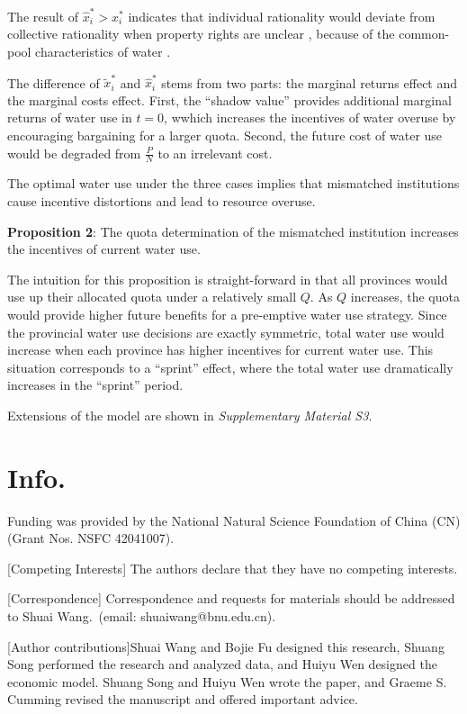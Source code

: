 \documentclass{article}
\begin{document}
The result of $\hat x_i^*>x_i^*$ indicates that individual rationality would deviate from collective rationality when property rights are unclear \cite{hardinTragedyCommons2009}, because of the common-pool characteristics of water
\cite{castilla-rhoGroundwaterCommonPool2020,ostromGeneralFrameworkAnalyzing2009}.

The difference of $\widetilde x_i^*$ and $\hat x_i^*$ stems from two parts: the marginal returns effect and the marginal costs effect. First, the “shadow value” provides additional marginal returns of water use in $t=0$, wwhich increases the incentives of water overuse by encouraging bargaining for a larger quota. Second, the future cost of water use would be degraded from $\frac{P}{N}$ to an irrelevant cost.

The optimal water use under the three cases implies that mismatched institutions cause incentive distortions and lead to resource overuse.

\textbf{Proposition 2}: The quota determination of the mismatched institution increases the incentives of current water use.

The intuition for this proposition is straight-forward in that all provinces would use up their allocated quota under a relatively small $Q$. As $Q$ increases, the quota would provide higher future benefits for a pre-emptive water use strategy. Since the provincial water use decisions are exactly symmetric, total water use would increase when each province has higher incentives for current water use. This situation corresponds to a “sprint” effect, where the total water use dramatically increases in the “sprint” period.

Extensions of the model are shown in \textit{Supplementary Material S3}.


\section{Info.}
Funding was provided by the National Natural Science Foundation of China (CN) (Grant Nos. NSFC 42041007).

[Competing Interests] The authors declare that they have no competing interests.

[Correspondence] Correspondence and requests for materials should be addressed to Shuai Wang.~(email: shuaiwang@bnu.edu.cn).

[Author contributions]Shuai Wang and Bojie Fu designed this research, Shuang Song performed the research and analyzed data, and Huiyu Wen designed the economic model. Shuang Song and Huiyu Wen wrote the paper, and Graeme S. Cumming revised the manuscript and offered important advice.
\end{document}
